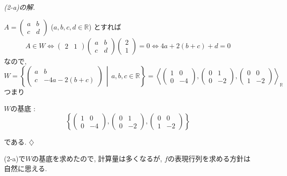 \documentclass[titlepage]{jsarticle}
\numberwithin{equation}{section}
\newcommand{\R}{\mathbb{R}}%
\newenvironment{kaitou}[1][解]{%
\begin{proofbox}%
\textit{#1. }\ignorespaces
}{%
\hfill$\diamondsuit$%
\end{proofbox}%
}
\begin{document}
\begin{kaitou}[(2-a)の解]
$A = 
\begin{pmatrix}
a & b\\
c & d
\end{pmatrix}$
($a, b, c, d \in \R$) とすれば
\begin{align}
A \in W \iff
\begin{pmatrix}
2 & 1
\end{pmatrix}
\begin{pmatrix}
a & b\\
c & d
\end{pmatrix}
\begin{pmatrix}
2\\
1
\end{pmatrix}
= 0
\iff 4a + 2(b + c) + d = 0 \label{eq:tmu2026-1a}
\end{align}
なので, 
\[
W=
\left\{
\begin{pmatrix}
a & b\\
c & -4a - 2(b+c)
\end{pmatrix}
\,
\middle|
\,
a, b, c \in \R
\right\}
=
\left\langle
\begin{pmatrix}
1 & 0\\
0 & -4
\end{pmatrix},
\begin{pmatrix}
0 & 1\\
0 & -2
\end{pmatrix},
\begin{pmatrix}
0 & 0\\
1 & -2
\end{pmatrix}
\right\rangle_\R
\]
つまり
\begin{answerbox}
$W$の基底 : 
\[
\left\{
\begin{pmatrix}
1 & 0\\
0 & -4
\end{pmatrix},
\begin{pmatrix}
0 & 1\\
0 & -2
\end{pmatrix},
\begin{pmatrix}
0 & 0\\
1 & -2
\end{pmatrix}
\right\}
\]
\end{answerbox}
である.
\end{kaitou}
(2-a)で$W$の基底を求めたので, 計算量は多くなるが, $f$の表現行列を求める方針は自然に思える.
\end{document}
